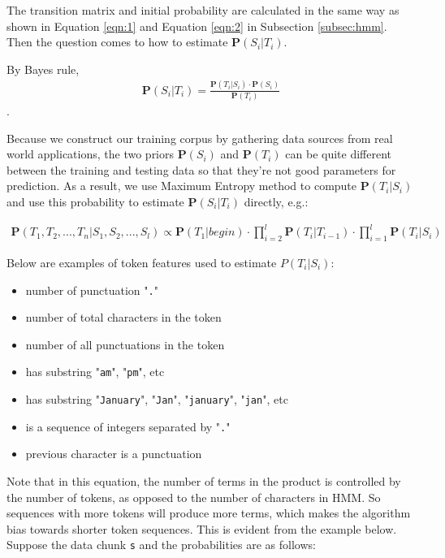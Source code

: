 The transition matrix and initial probability are calculated in the
same way as shown in Equation \ref{eqn:1} and Equation \ref{eqn:2}
in Subsection \ref{subsec:hmm}. Then the question comes to how to
estimate $\mathbf{P}(S_i|T_i)$.

By Bayes rule,
\begin{eqnarray*}
\mathbf{P}(S_i|T_i) = \frac{\mathbf{P}(T_i|S_i) \cdot
\mathbf{P}(S_i)}{\mathbf{P}(T_i)}
\end{eqnarray*}.

Because we construct our training corpus by gathering data sources 
from real world applications, the two priors $\mathbf{P}(S_i)$ and
$\mathbf{P}(T_i)$ can be quite different between the training and
testing data so that they're not good parameters for prediction. As
a result, we use Maximum Entropy method to compute
$\mathbf{P}(T_i|S_i)$ and use this probability to estimate
$\mathbf{P}(S_i|T_i)$ directly, e.g.:

\begin{eqnarray*}
\mathbf{P}(T_1, T_2, ..., T_n|S_1, S_2, ..., S_l) \propto
\mathbf{P}(T_1|begin) \cdot \prod_{i=2}^{l}\mathbf{P}(T_i|T_{i-1})
\cdot \prod_{i=1}^{l}\mathbf{P}(T_i|S_i)
\end{eqnarray*}

Below are examples of token features used to estimate
$P(T_i|S_i)$:

\begin{itemize}
\item number of punctuation "{\tt .}"
\item number of total characters in the token
\item number of all punctuations in the token
\item has substring "{\tt am}", "{\tt pm}", etc
\item has substring "{\tt January}", "{\tt Jan}", "{\tt january}",
"{\tt jan}", etc
\item is a sequence of integers separated by "{\tt .}"
\item previous character is a punctuation
\end{itemize}

Note that in this equation, the number of terms in the product is
controlled by the number of tokens, as opposed to the number of
characters in HMM. So sequences with more tokens will produce more terms, 
which makes the algorithm bias towards shorter token sequences. 
This is evident from the example below.
Suppose the data chunk {\tt s} and the probabilities are as
follows:


